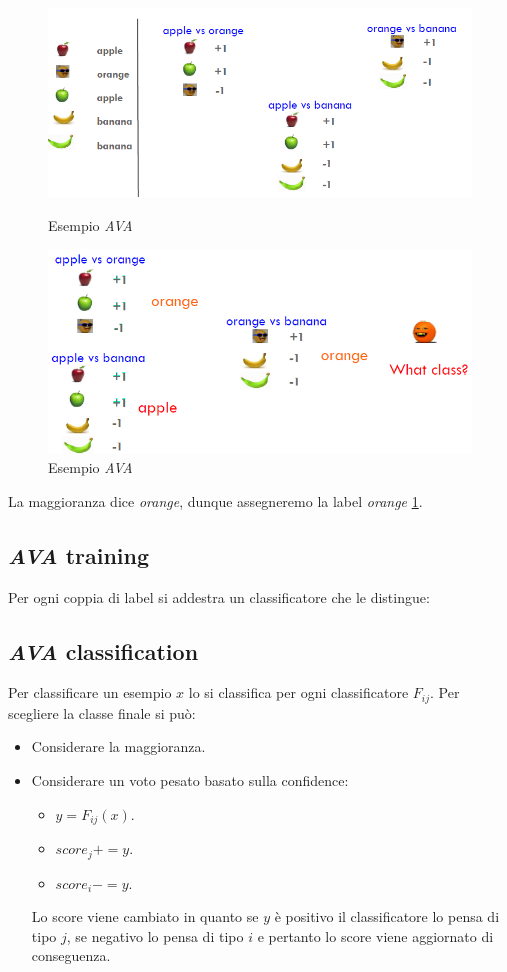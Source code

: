 	\begin{figure}
		\centering
		\begin{minipage}{.5\textwidth}
			\centering
			\includegraphics[width=0.8\linewidth]{imgs/chapter6/img2}
			\caption{Esempio \emph{AVA}}
			\label{fig:chapter06-02}
		\end{minipage}%
		\begin{minipage}{.5\textwidth}
			\centering
			\includegraphics[width=0.8\linewidth]{imgs/chapter6/img3}
			\caption{Esempio \emph{AVA}}
			\label{fig:chapter06-03}
		\end{minipage}
	\end{figure}
	La maggioranza dice \emph{orange}, dunque assegneremo la label \emph{orange} \ref{fig:chapter06-03}.
	\subsection{\emph{AVA} training}
	Per ogni coppia di label si addestra un classificatore che le distingue:\\
	



	\subsection{\emph{AVA} classification}
	Per classificare un esempio $x$ lo si classifica per ogni classificatore $F_{ij}$.
	Per scegliere la classe finale si pu\`o:
	\begin{itemize}
		\item Considerare la maggioranza.
		\item Considerare un voto pesato basato sulla confidence:
			\begin{itemize}
				\item $y = F_{ij}(x)$.
				\item $score_j +=y$.
				\item $score_i -=y$.
			\end{itemize}
			Lo score viene cambiato in quanto se $y$ \`e positivo il classificatore lo pensa di tipo $j$, se negativo lo pensa di tipo $i$ e pertanto lo score viene aggiornato di conseguenza.
	\end{itemize}

